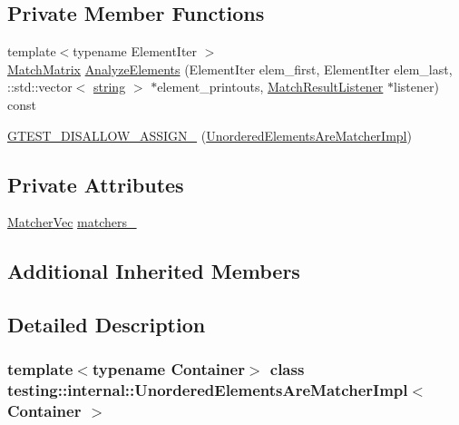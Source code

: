 \subsection*{Private Member Functions}
\begin{DoxyCompactItemize}
\item 
{\footnotesize template$<$typename Element\+Iter $>$ }\\\hyperlink{classtesting_1_1internal_1_1MatchMatrix}{Match\+Matrix} \hyperlink{classtesting_1_1internal_1_1UnorderedElementsAreMatcherImpl_a327b473a760be4b4e0b3495b4e15a7e8}{Analyze\+Elements} (Element\+Iter elem\+\_\+first, Element\+Iter elem\+\_\+last, \+::std\+::vector$<$ \hyperlink{namespacetesting_1_1internal_a8e8ff5b11e64078831112677156cb111}{string} $>$ $\ast$element\+\_\+printouts, \hyperlink{classtesting_1_1MatchResultListener}{Match\+Result\+Listener} $\ast$listener) const
\item 
\hyperlink{classtesting_1_1internal_1_1UnorderedElementsAreMatcherImpl_a239a646747dc155e8cd69903cd1e0286}{G\+T\+E\+S\+T\+\_\+\+D\+I\+S\+A\+L\+L\+O\+W\+\_\+\+A\+S\+S\+I\+G\+N\+\_\+} (\hyperlink{classtesting_1_1internal_1_1UnorderedElementsAreMatcherImpl}{Unordered\+Elements\+Are\+Matcher\+Impl})
\end{DoxyCompactItemize}
\subsection*{Private Attributes}
\begin{DoxyCompactItemize}
\item 
\hyperlink{classtesting_1_1internal_1_1UnorderedElementsAreMatcherImpl_afc098105ab7ac15cba95ca34644f0cef}{Matcher\+Vec} \hyperlink{classtesting_1_1internal_1_1UnorderedElementsAreMatcherImpl_a8f369b32578badf837a76ee66b033c81}{matchers\+\_\+}
\end{DoxyCompactItemize}
\subsection*{Additional Inherited Members}


\subsection{Detailed Description}
\subsubsection*{template$<$typename Container$>$\newline
class testing\+::internal\+::\+Unordered\+Elements\+Are\+Matcher\+Impl$<$ Container $>$}



